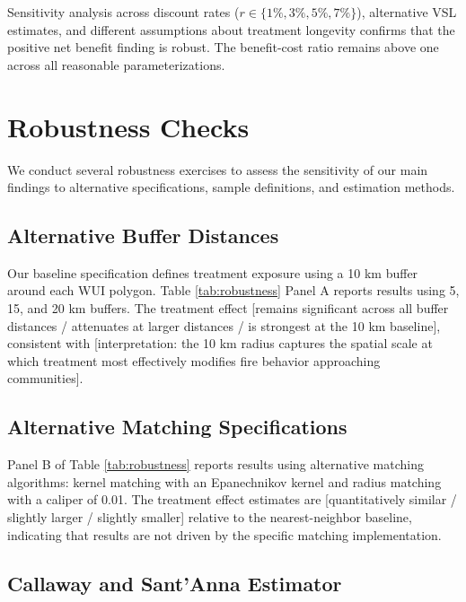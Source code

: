 \documentclass[12pt, letterpaper]{article}
\begin{document}
Sensitivity analysis across discount rates ($r \in \{1\%, 3\%, 5\%, 7\%\}$), alternative VSL estimates, and different assumptions about treatment longevity confirms that the positive net benefit finding is robust. The benefit-cost ratio remains above one across all reasonable parameterizations.


\section{Robustness Checks}

We conduct several robustness exercises to assess the sensitivity of our main findings to alternative specifications, sample definitions, and estimation methods.

\subsection{Alternative Buffer Distances}

Our baseline specification defines treatment exposure using a 10 km buffer around each WUI polygon. Table \ref{tab:robustness} Panel A reports results using 5, 15, and 20 km buffers. The treatment effect [remains significant across all buffer distances / attenuates at larger distances / is strongest at the 10 km baseline], consistent with [interpretation: the 10 km radius captures the spatial scale at which treatment most effectively modifies fire behavior approaching communities].

\subsection{Alternative Matching Specifications}

Panel B of Table \ref{tab:robustness} reports results using alternative matching algorithms: kernel matching with an Epanechnikov kernel and radius matching with a caliper of 0.01. The treatment effect estimates are [quantitatively similar / slightly larger / slightly smaller] relative to the nearest-neighbor baseline, indicating that results are not driven by the specific matching implementation.

\subsection{Callaway and Sant'Anna Estimator}
\end{document}
